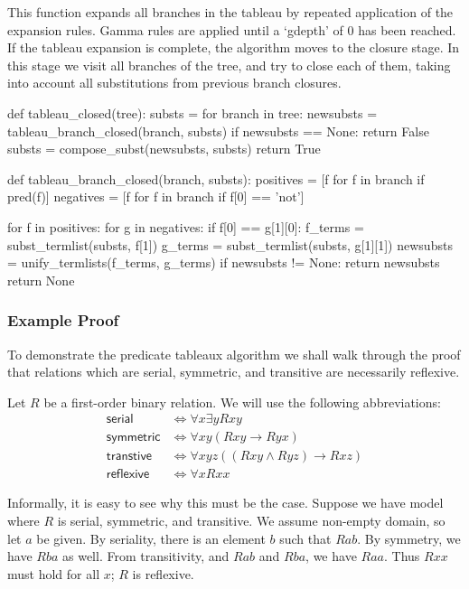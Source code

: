 \documentclass[a4paper,notitlepage]{scrartcl}
\begin{document}
This function expands all branches in the tableau by repeated application of
the expansion rules. Gamma rules are applied until a `gdepth' of 0 has been
reached. If the tableau expansion is complete, the algorithm moves to the
closure stage. In this stage we visit all branches of the tree, and try to
close each of them, taking into account all substitutions from previous branch
closures.

\begin{code}
def tableau_closed(tree):
    substs = {}
    for branch in tree:
        newsubsts = tableau_branch_closed(branch, substs)
        if newsubsts == None:
            return False
        substs = compose_subst(newsubsts, substs)
    return True

def tableau_branch_closed(branch, substs):
    positives = [f for f in branch if pred(f)]
    negatives = [f for f in branch if f[0] == 'not']

    for f in positives:
        for g in negatives:
            if f[0] == g[1][0]:
                f_terms = subst_termlist(substs, f[1])
                g_terms = subst_termlist(substs, g[1][1])
                newsubsts = unify_termlists(f_terms, g_terms)
                if newsubsts != None:
                    return newsubsts
    return None
\end{code}

\subsubsection{Example Proof}

To demonstrate the predicate tableaux algorithm we shall walk through the
   proof that relations which are serial, symmetric, and transitive are
   necessarily reflexive.

Let $R$ be a first-order binary relation. 
We will use the following abbreviations:
\begin{align*}
\textsf{serial}& \iff \forall x\exists yRxy\\
\textsf{symmetric}& \iff \forall xy(Rxy\rightarrow Ryx)\\
\textsf{transtive}& \iff \forall xyz((Rxy\land Ryz)\rightarrow Rxz)\\
\textsf{reflexive}& \iff \forall x Rxx
\end{align*}

Informally, it is easy to see why this must be the case.
Suppose we have model where $R$ is serial, symmetric, and transitive.
We assume non-empty domain, so let $a$ be given.
By seriality, there is an element $b$ such that $Rab$.
By symmetry, we have $Rba$ as well.
From transitivity, and $Rab$ and $Rba$, we have $Raa$.
Thus $Rxx$ must hold for all $x$; $R$ is reflexive.
\end{document}
